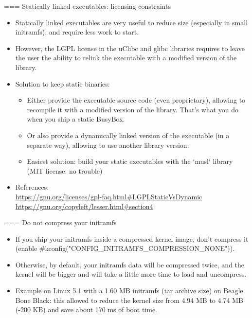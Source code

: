 === Statically linked executables: licensing constraints
\begin{itemize}
\item Statically linked executables are very useful to reduce size
      (especially in small initramfs), and require less work to start.
\item However, the LGPL license in the uClibc and glibc libraries
      requires to leave the user the ability to relink the executable
      with a modified version of the library.
\item Solution to keep static binaries:
      \begin{itemize}
      \item Either provide the executable source code (even
            proprietary), allowing to recompile it with a modified
            version of the library. That's what you do when
            you ship a static BusyBox.
      \item Or also provide a dynamically linked version of the
	    executable (in a separate way), allowing to use another
            library version.
      \item Easiest solution: build your static executables with the
	    `musl` library (MIT license: no trouble)
      \end{itemize}
\item References: \\
      {\footnotesize
      \url{https://gnu.org/licenses/gpl-faq.html\#LGPLStaticVsDynamic} \\
      \url{https://gnu.org/copyleft/lesser.html\#section4}
      }
\end{itemize}


=== Do not compress your initramfs
\begin{itemize}
\item If you ship your initramfs inside a compressed kernel image, don't compress
      it \\
      (enable #kconfig("CONFIG_INITRAMFS_COMPRESSION_NONE")).
\item Otherwise, by default, your initramfs data will be compressed twice, and
      the kernel will be bigger and will take a little more time to load
      and uncompress.
\item Example on Linux 5.1 with a 1.60 MB initramfs (tar archive size)
      on Beagle Bone Black: this allowed to reduce the kernel size from 4.94
      MB to 4.74 MB (-200 KB) and save about 170 ms of boot time.
\end{itemize}


